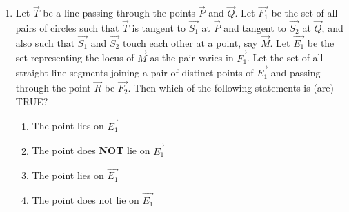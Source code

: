 \documentclass[journal,12pt,twocolumn]{IEEEtran}
\theoremstyle{remark}
\begin{document}
\begin{enumerate}
\hfill {}
\begin{enumerate}
	\item {}
	\item {}
	\item {}
	\item {}
\end{enumerate}
\item Let $\vec{T}$ be a line passing through the points $\vec{P}$ and $\vec{Q}$. Let $\vec{F_1}$ be the set of all pairs of circles  such that $\vec{T}$ is tangent to $\vec{S_1}$ at $\vec{P}$ and tangent to $\vec{S_2}$ at $\vec{Q}$, and also such that $\vec{S_1}$ and $\vec{S_2}$ touch each other at a point, say $\vec{M}$. Let $\vec{E_1}$ be the set representing the locus of $\vec{M}$ as the pair  varies in $\vec{F_1}$. Let the set of all straight line segments joining a pair of distinct points of $\vec{E_1}$ and passing through the point $\vec{R}$ be $\vec{F_2}$. Then which of the following statements is (are) TRUE?

\hfill{}
\begin{enumerate}
\item The point  lies on $\vec{E_1}$
\item The point  does \textbf{NOT} lie on $\vec{E_1}$
\item The point  lies on $\vec{E_1}$
\item The point  does not lie on $\vec{E_1}$
\end{enumerate}
\end{enumerate}
\end{document}
